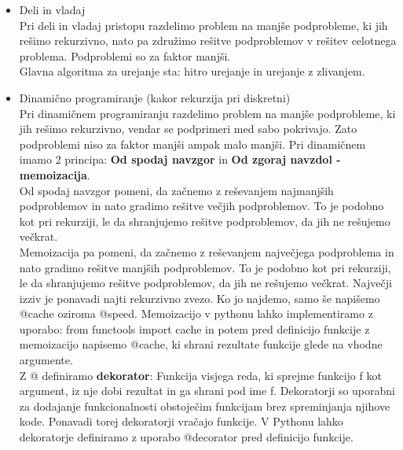 \documentclass[a4paper]{article}
\begin{document}
\begin{itemize}
        Kako konstantno izračunamo dolžino?\\
        let sestavljen l d x = Sestavljen(1 + max (visina l) (visina d), l, x, d)\\
        Čas za ustavitev tega drevesa in izracun dolzine je zdaj O(1), saj imamo v vsakem vozlišču shranjeno dolžino poddrevesa. Torej lahko dolžino izračunamo v O(1) času.
        \item Deli in vladaj\\
        Pri deli in vladaj pristopu razdelimo problem na manjše podprobleme, ki jih rešimo rekurzivno, nato pa združimo rešitve podproblemov v rešitev celotnega problema. Podproblemi so za faktor manjši.\\
        Glavna algoritma za urejanje sta: hitro urejanje in urejanje z zlivanjem.
        \item Dinamično programiranje (kakor rekurzija pri diskretni)\\
        Pri dinamičnem programiranju razdelimo problem na manjše podprobleme, ki jih rešimo rekurzivno, vendar se podprimeri med sabo pokrivajo. Zato podproblemi niso za faktor manjši ampak malo manjši. Pri dinamičnem imamo 2 principa: \textbf{Od spodaj navzgor} in \textbf{Od zgoraj navzdol -  memoizacija}.\\
        Od spodaj navzgor pomeni, da začnemo z reševanjem najmanjših podproblemov in nato gradimo rešitve večjih podproblemov. To je podobno kot pri rekurziji, le da shranjujemo rešitve podproblemov, da jih ne rešujemo večkrat.\\
        Memoizacija pa pomeni, da začnemo z reševanjem največjega podproblema in nato gradimo rešitve manjših podproblemov. To je podobno kot pri rekurziji, le da shranjujemo rešitve podproblemov, da jih ne rešujemo večkrat. Največji izziv je ponavadi najti rekurzivno zvezo. Ko jo najdemo, samo še napišemo @cache oziroma @speed.
        Memoizacijo v pythonu lahko implementiramo z uporabo: from functools import cache in potem pred definicijo funkcije z memoizacijo napisemo @cache, ki shrani rezultate funkcije glede na vhodne argumente.\\
        Z @ definiramo \textbf{dekorator}: Funkcija visjega reda, ki sprejme funkcijo f kot argument, iz nje dobi rezultat in ga shrani pod ime f. Dekoratorji so uporabni za dodajanje funkcionalnosti obstoječim funkcijam brez spreminjanja njihove kode. Ponavadi torej dekoratorji vračajo funkcije. V Pythonu lahko dekoratorje definiramo z uporabo @decorator pred definicijo funkcije. \\

\end{itemize}
\end{document}
